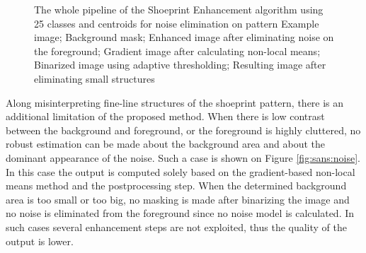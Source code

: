 \documentclass[draft,final]{vutinfth} %
\begin{document}
{\begin{figure}[H]

\caption{The whole pipeline of the Shoeprint Enhancement algorithm using 25 classes and centroids for noise elimination on pattern
				 Example image;  Background mask;  Enhanced image after eliminating noise on the foreground;  Gradient image after calculating non-local means;   Binarized image using adaptive thresholding;  Resulting image after eliminating small structures}
\label{fig:sans:pip}

\end{figure}
}

\par
Along misinterpreting fine-line structures of the shoeprint pattern, there is an additional limitation of the proposed method.
When there is low contrast between the background and foreground, or the foreground is highly cluttered, no robust estimation can be made about the background area and about the dominant appearance of the noise. 
Such a case is shown on Figure \ref{fig:sans:noise}.
In this case the output is computed solely based on the gradient-based non-local means method and the postprocessing step.
When the determined background area is too small or too big, no masking is made after binarizing the image and no noise is eliminated from the foreground since no noise model is calculated.
In such cases several enhancement steps are not exploited, thus the quality of the output is lower. 
\end{document}
